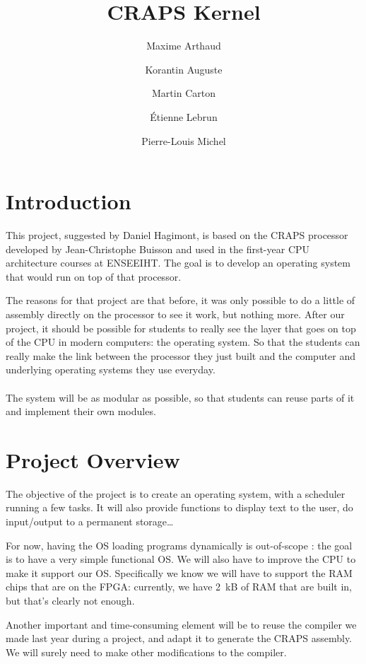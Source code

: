 \documentclass{article}
\title{CRAPS Kernel}
\author{
       Maxime Arthaud
  \and Korantin Auguste
  \and Martin Carton
  \and Étienne Lebrun
  \and Pierre-Louis Michel
}
\begin{document}
  
  \tableofcontents
  \newpage

  \section{Introduction}
    This project, suggested by Daniel Hagimont, is based on the CRAPS processor
    developed by Jean-Christophe Buisson and used in the first-year CPU
    architecture courses at ENSEEIHT. The goal is to develop an operating
    system that would run on top of that processor.

    The reasons for that project are that before, it was only possible to do a
    little of assembly directly on the processor to see it work, but nothing
    more.  After our project, it should be possible for students to really see
    the layer that goes on top of the CPU in modern computers: the operating
    system. So that the students can really make the link between the processor
    they just built and the computer and underlying operating systems they use
    everyday.

    \paragraph{}
    The system will be as modular as possible, so that students can reuse parts
    of it and implement their own modules.

  \section{Project Overview}
    The objective of the project is to create an operating system, with a
    scheduler running a few tasks. It will also provide functions to display
    text to the user, do input/output to a permanent storage\dots

    For now, having the OS loading programs dynamically is out-of-scope : the
    goal is to have a very simple functional OS.  We will also have to improve
    the CPU to make it support our OS. Specifically we know we will have to
    support the RAM chips that are on the FPGA: currently, we have \SI{2}{kB}
    of RAM that are built in, but that's clearly not enough.

    Another important
    and time-consuming element will be to reuse the compiler we made last year
    during a project, and adapt it to generate the CRAPS assembly. We will
    surely need to make other modifications to the compiler.
\end{document}
